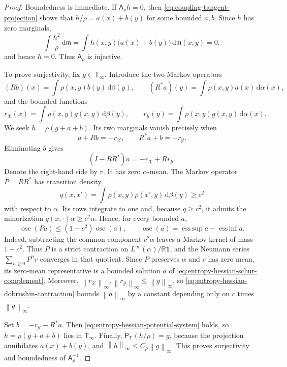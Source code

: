 \documentclass[11pt]{article}
\theoremstyle{definition}
\theoremstyle{remark}
\newcommand{\R}{\mathbb R}
\newcommand{\one}{\mathbf 1}
\newcommand{\dd}{\,\mathrm d}
\newcommand{\norm}[1]{\left\lVert #1\right\rVert}
\begin{document}
\begin{proof}
Boundedness is immediate.  If \(\mathsf A_\rho h=0\), then
\eqref{eq:coupling-tangent-projection} shows that
\(h/\rho=a(x)+b(y)\) for some bounded \(a,b\).  Since \(h\) has zero
marginals,
\[
 \int\frac{h^2}{\rho}\dd\mathfrak m
 =
 \int h(x,y)\bigl(a(x)+b(y)\bigr)\dd\mathfrak m(x,y)
 =0,
\]
and hence \(h=0\).  Thus \(\mathsf A_\rho\) is injective.

To prove surjectivity, fix \(g\in\mathsf T_\infty\).  Introduce the two
Markov operators
\[
 (Rb)(x)=\int\rho(x,y)b(y)\dd\beta(y),
 \qquad
 (R^*a)(y)=\int\rho(x,y)a(x)\dd\alpha(x),
\]
and the bounded functions
\[
 r_{\mathcal X}(x)=\int\rho(x,y)g(x,y)\dd\beta(y),
 \qquad
 r_{\mathcal Y}(y)=\int\rho(x,y)g(x,y)\dd\alpha(x).
\]
We seek \(h=\rho(g+a+b)\).  Its two marginals vanish precisely when
\begin{equation}\label{eq:entropy-hessian-potential-system}
 a+Rb=-r_{\mathcal X},
 \qquad
 R^*a+b=-r_{\mathcal Y}.
\end{equation}
Eliminating \(b\) gives
\begin{equation}\label{eq:entropy-hessian-schur-complement}
 (I-RR^*)a=-r_{\mathcal X}+Rr_{\mathcal Y}.
\end{equation}
Denote the right-hand side by \(r\).  It has zero \(\alpha\)-mean.  The
Markov operator \(P=RR^*\) has transition density
\[
 q(x,x')
 =
 \int\rho(x,y)\rho(x',y)\dd\beta(y)
 \geq c^2
\]
with respect to \(\alpha\).  Its rows integrate to one and, because
\(q\geq c^2\), it admits the minorization
\(q(x,\cdot)\alpha\geq c^2\alpha\).  Hence, for every bounded \(a\),
\begin{equation}\label{eq:entropy-hessian-dobrushin-contraction}
 \operatorname{osc}(Pa)
 \leq
 (1-c^2)\operatorname{osc}(a),
 \qquad
 \operatorname{osc}(a)=\operatorname*{ess\,sup}a-
                         \operatorname*{ess\,inf}a.
\end{equation}
Indeed, subtracting the common component \(c^2\alpha\) leaves a Markov
kernel of mass \(1-c^2\).  Thus \(P\) is a strict contraction on
\(L^\infty(\alpha)/\R\one\), and the Neumann series
\(\sum_{n\geq0}P^nr\) converges in that quotient.  Since \(P\) preserves
\(\alpha\) and \(r\) has zero mean, its zero-mean representative is a
bounded solution \(a\) of
\eqref{eq:entropy-hessian-schur-complement}.  Moreover,
\(\norm{r_{\mathcal X}}_\infty,\norm{r_{\mathcal Y}}_\infty
\leq\norm g_\infty\), so \eqref{eq:entropy-hessian-dobrushin-contraction}
bounds \(\norm a_\infty\) by a constant depending only on \(c\) times
\(\norm g_\infty\).

Set \(b=-r_{\mathcal Y}-R^*a\).  Then
\eqref{eq:entropy-hessian-potential-system} holds, so
\(h=\rho(g+a+b)\) lies in \(\mathsf T_\infty\).  Finally,
\(\mathsf P_{\mathsf T}(h/\rho)=g\), because the projection annihilates
\(a(x)+b(y)\), and
\(\norm h_\infty\leq C_\rho\norm g_\infty\).  This proves surjectivity and
boundedness of \(\mathsf A_\rho^{-1}\).
\end{proof}
\end{document}
